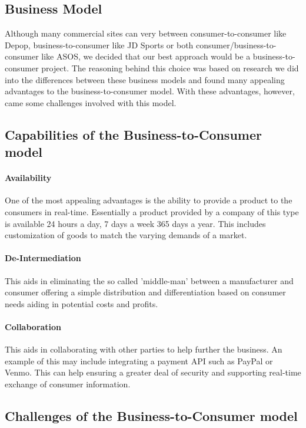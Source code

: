 \subsection{Business Model}

Although many commercial sites can very between consumer-to-consumer like Depop, business-to-consumer like JD Sports or both consumer/business-to-consumer like ASOS, we decided that our best approach would be a business-to-consumer project. The reasoning behind this choice was based on research we did into the differences between these business models and found many appealing advantages to the business-to-consumer model. With these advantages, however, came some challenges involved with this model.

\subsection{Capabilities of the Business-to-Consumer model}
\paragraph{Availability}One of the most appealing advantages is the ability to provide a product to the consumers in real-time. Essentially a product provided by a company of this type is available 24 hours a day, 7 days a week 365 days a year. This includes customization of goods to match the varying demands of a market\cite{santosh_2015}.

\paragraph{De-Intermediation}This aids in eliminating the so called 'middle-man' between a manufacturer and consumer offering a simple distribution and differentiation based on consumer needs aiding in potential costs and profits\cite{santosh_2015}.

\paragraph{Collaboration}This aids in collaborating with other parties to help further the business. An example of this may include integrating a payment API such as PayPal or Venmo. This can help ensuring a greater deal of security and supporting real-time exchange of consumer information\cite{santosh_2015}.

\subsection{Challenges of the Business-to-Consumer model}
